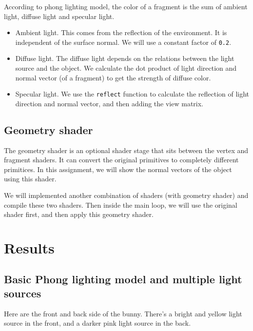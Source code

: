 \documentclass[acmtog]{acmart}
\begin{document}
According to phong lighting model, the color of a fragment is the sum of ambient light, diffuse light and specular light.

\begin{itemize}
	\item Ambient light. This comes from the reflection of the environment. It is independent of the surface normal. We will use a constant factor of \verb|0.2|.
	\item Diffuse light. The diffuse light depends on the relations between the light source and the object. We calculate the dot product of light direction and normal vector (of a fragment) to get the strength of diffuse color.
	\item Specular light. We use the \verb|reflect| function to calculate the reflection of light direction and normal vector, and then adding the view matrix.
\end{itemize}


\subsection{Geometry shader}

The geometry shader is an optional shader stage that sits between the vertex and fragment shaders. It can convert the original primitives to completely different primitices. In this assignment, we will show the normal vectors of the object using this shader. 

We will implemented another combination of shaders (with geometry shader) and compile these two shaders. Then inside the main loop, we will use the original shader first, and then apply this geometry shader.



\section{Results}

\subsection{Basic Phong lighting model and multiple light sources}

Here are the front and back side of the bunny. There's a bright and yellow light source in the front, and a darker pink light source in the back.
\end{document}
